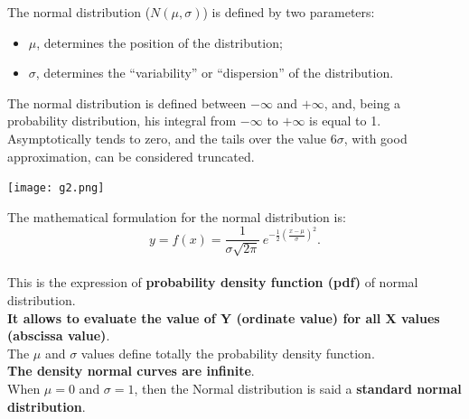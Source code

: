 \begin{frame} 
  \vspace*{.25cm}
  The normal distribution ($N(\mu,\sigma)$) is defined by two parameters:
  \begin{itemize}
    \item $\mu$, determines the position of the distribution;
    \item $\sigma$, determines the ``variability'' or ``dispersion'' of the distribution.
  \end{itemize}
  \vspace*{.75cm}
  The normal distribution is defined between $-\infty$ and $+\infty$, and, being a probability distribution, his integral from $-\infty$ to $+\infty$ is equal to 1.\\
  \vspace*{.75cm}
  Asymptotically tends to zero, and  the tails over the value $6\sigma$, with good approximation, can be considered truncated.\\
\end{frame}

\begin{frame}
  \vspace{-0.25cm}
  \begin{center}
    \texttt{[image: g2.png]}
  \end{center}
\end{frame}

\begin{frame} 
  \vspace*{.15cm}
  The mathematical formulation for the normal distribution is:
  \vspace*{.15cm}
  $$y=f(x)=\frac{1}{\sigma \sqrt{2\pi}}\, e^{-\frac{1}{2}\left ( \frac{x-\mu}{\sigma}\right)^2}.$$  \\
  \vspace*{.15cm}
  This is the expression of \textbf{probability density function (pdf)} of normal distribution.\\
  \vspace*{.15cm}
  \textbf{It allows to evaluate the value of Y (ordinate value) for all X values (abscissa value)}.\\
  \vspace*{.15cm}
  The $\mu$ and $\sigma$  values define totally the probability density function.\\
  \vspace*{.15cm}
  \textbf{The density normal curves are infinite}.\\
  \vspace*{.15cm}
  When $\mu=0$ and $\sigma=1$, then the Normal distribution is said a \textbf{standard normal distribution}.
\end{frame}

